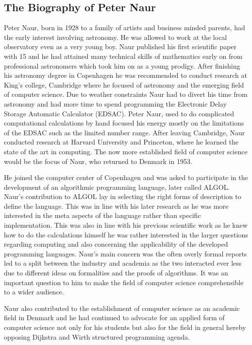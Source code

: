 \documentclass{article}
\begin{document}
\subsection{The Biography of Peter Naur}
Peter Naur, born in 1928 to a family of artists and business minded parents, had the early interest involving astronomy. He was allowed to work at the local observatory even as a very young boy. Naur published his first scientific paper with 15 and he had attained many technical skills of mathematics early on from professional astronomers which took him on as a young prodigy. After finishing his astronomy degree in Copenhagen he was recommended to conduct research at King's college, Cambridge where he focused of astronomy and the emerging field of computer science. Due to weather constraints Naur had to divert his time from astronomy and had more time to spend programming the Electronic Delay Storage Automatic Calculator (EDSAC). Peter Naur, used to do complicated computational calculations by hand focused his energy mostly on the limitations of the EDSAC such as the limited number range. After leaving Cambridge, Naur conducted research at Harvard University and Princeton, where he learned the state of the art in computing. The now more established field of computer science would be the focus of Naur, who returned to Denmark in 1953.

He joined the computer center of Copenhagen and was asked to participate in the development of an algorithmic programming language, later called ALGOL. Naur's contribution to ALGOL lay in selecting the right forms of description to define the language. This was in line with his later research as he was more interested in the meta aspects of the language rather than specific implementation. This was also in line with his previous scientific work as he knew how to do the calculations himself he was rather interested in the larger questions regarding computing and also concerning the applicability of the  developed programming languages. Naur's main concern was the often overly formal reports led to a split between the industry and academia as the two interacted ever less due to different ideas on formalities and the proofs of algorithms. It was an important question to him to make the field of computer science comprehensible to a wider audience.

Naur also contributed to the establishment of computer science as an academic field in Denmark and he had continued to advocate for an applied form of computer science not only for his students but also for the field in general hereby opposing Dijkstra and Wirth structured programming agenda.
\end{document}

